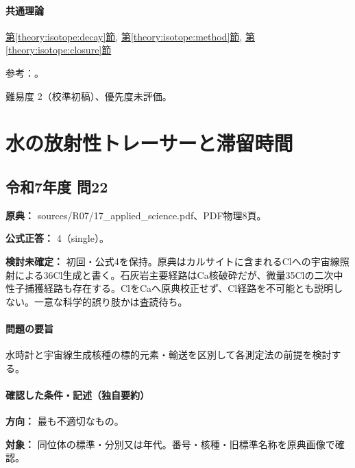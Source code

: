 \paragraph{共通理論} \hyperref[theory:isotope:decay]{第\ref*{theory:isotope:decay}節}, \hyperref[theory:isotope:method]{第\ref*{theory:isotope:method}節}, \hyperref[theory:isotope:closure]{第\ref*{theory:isotope:closure}節}

\par 参考：\cite{iso_radiometric,iso_zircon}。

\par 難易度 2（校準初稿）、優先度未評価。

\section{水の放射性トレーサーと滞留時間}

\subsection{令和7年度 問22}
\label{q:r07-reg-applied-22}

\noindent\textbf{原典：} sources/R07/17\_applied\_science.pdf、PDF物理8頁。

\textbf{公式正答：} 4（single）。

\par\textbf{検討未確定：} 初回・公式4を保持。原典はカルサイトに含まれるClへの宇宙線照射による36Cl生成と書く。石灰岩主要経路はCa核破砕だが、微量35Clの二次中性子捕獲経路も存在する。ClをCaへ原典校正せず、Cl経路を不可能とも説明しない。一意な科学的誤り肢かは査読待ち。

\paragraph{問題の要旨} 水時計と宇宙線生成核種の標的元素・輸送を区別して各測定法の前提を検討する。

\paragraph{確認した条件・記述（独自要約）}\mbox{}\par

\noindent\textbf{方向：} 最も不適切なもの。\par

\noindent\textbf{対象：} 同位体の標準・分別又は年代。番号・核種・旧標準名称を原典画像で確認。\par

